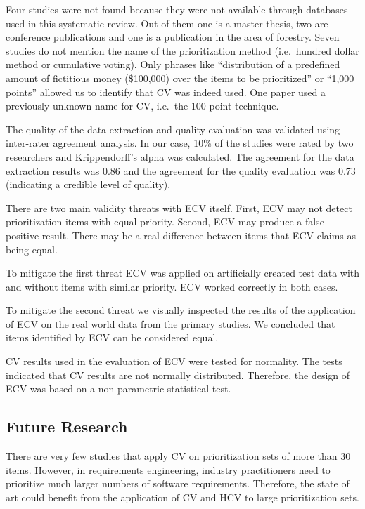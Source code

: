 Four studies were not found because they were not available through databases used in this systematic review. Out of them one is a master thesis, two are conference publications and one is a publication in the area of forestry.
Seven studies do not mention the name of the prioritization method (i.e.\ hundred dollar method or cumulative voting).
Only phrases like ``distribution of a predefined amount of fictitious money (\$100,000) over the items to be prioritized'' or ``1,000 points'' allowed us to identify that CV was indeed used. One paper used a previously unknown name for CV, i.e.\ the 100-point technique.

The quality of the data extraction and quality evaluation was validated using inter-rater agreement analysis.
In our case, 10\% of the studies were rated by two researchers and Krippendorff's alpha was calculated.
The agreement for the data extraction results was 0.86 and the agreement for the quality evaluation was 0.73 (indicating a credible level of quality).
%

There are two main validity threats with ECV itself.
First, ECV may not detect prioritization items with equal priority.
Second, ECV may produce a false positive result. There may be a real difference between items that ECV claims as being equal.

To mitigate the first threat ECV was applied on artificially created test data with and without items with similar priority.
ECV worked correctly in both cases.

To mitigate the second threat we visually inspected the results of the application of ECV on the real world data from the primary studies.
We concluded that items identified by ECV can be considered equal.

CV results used in the evaluation of ECV were tested for normality.
The tests indicated that CV results are not normally distributed.
Therefore, the design of ECV was based on a non-parametric statistical test.

\subsection{Future Research}
There are very few studies that apply CV on prioritization sets of more than 30 items.
However, in requirements engineering, industry practitioners need to prioritize much larger numbers of software requirements.
Therefore, the state of art could benefit from the application of CV and HCV to large prioritization sets.

